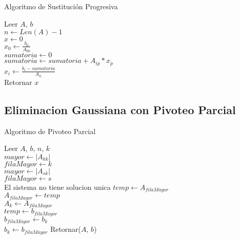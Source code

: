 \documentclass[12pt]{article}
\begin{document}
        \begin{algorithm}[H]
            \caption{Algoritmo de Sustitución Progresiva}
            Leer $A$, $b$ \\
            $n \leftarrow Len(A) - 1$\\
            $x \leftarrow 0$\\
            $x_0 \leftarrow \frac{b_0}{A_00}$\\
            {
                $sumatoria \leftarrow 0$\\
                {
                    $sumatoria \leftarrow sumatoria + A_{ip}*x_{p}$\\
                }
                $x_{i} \leftarrow \frac{b_{i} - sumatoria}{A_{ii}}$\\
            }
            Retornar $x$\\
        \end{algorithm}

        \subsection{Eliminacion Gaussiana con Pivoteo Parcial}
        
        \begin{algorithm}[H]
            \caption{Algoritmo de Pivoteo Parcial}
            Leer $A$, $b$, $n$, $k$ \\
            $mayor \leftarrow |A_{kk}|$\\
            $filaMayor \leftarrow k$\\
            {
                {
                    $mayor \leftarrow |A_{sk}| $ \\
                    $filaMayor \leftarrow s$\\
                }
            }
            {
                El sistema no tiene solucion unica
            } 
            {
                $temp \leftarrow A_{filaMayor}$\\
                $A_{filaMayor} \leftarrow temp$\\
                $A_{k} \leftarrow A_{filaMayor}$\\
                $temp \leftarrow b_{filaMayor}$\\
                $b_{filaMayor} \leftarrow b_{k}$\\
                $b_{k} \leftarrow b_{filaMayor}$
            }
            Retornar($A$, $b$)
        \end{algorithm}
\end{document}
